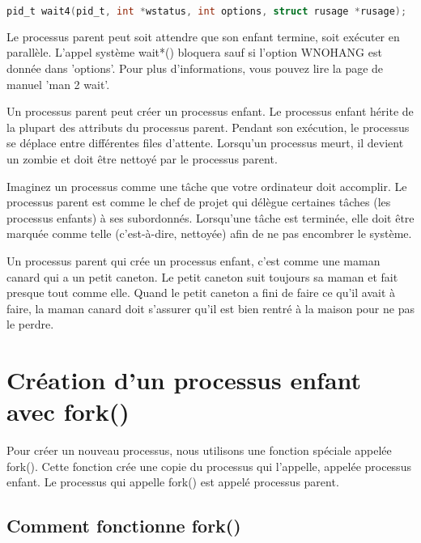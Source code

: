 \documentclass[12pt]{report}
\begin{document}
\begin{lstlisting}[language=C]
pid_t wait4(pid_t, int *wstatus, int options, struct rusage *rusage);
\end{lstlisting}

Le processus parent peut soit attendre que son enfant termine, soit exécuter en parallèle. L'appel système wait*() bloquera sauf si l'option WNOHANG est donnée dans 'options'. Pour plus d'informations, vous pouvez lire la page de manuel 'man 2 wait'.
\begin{tcolorbox}[colback=yellow!5, colframe=yellow!80!black, title={\faBookmark À retenir}]
Un processus parent peut créer un processus enfant. Le processus enfant hérite de la plupart des attributs du processus parent. Pendant son exécution, le processus se déplace entre différentes files d'attente. Lorsqu'un processus meurt, il devient un zombie et doit être nettoyé par le processus parent.
\end{tcolorbox}
\begin{tcolorbox}[colback=green!5, colframe=green!75!black, title={\faLightbulb Intuition}]
Imaginez un processus comme une tâche que votre ordinateur doit accomplir. Le processus parent est comme le chef de projet qui délègue certaines tâches (les processus enfants) à ses subordonnés. Lorsqu'une tâche est terminée, elle doit être marquée comme telle (c'est-à-dire, nettoyée) afin de ne pas encombrer le système.
\end{tcolorbox}
\begin{tcolorbox}[colback=blue!5, colframe=blue!75!black, title={\faLightbulb Vulgarisation simple}]
Un processus parent qui crée un processus enfant, c'est comme une maman canard qui a un petit caneton. Le petit caneton suit toujours sa maman et fait presque tout comme elle. Quand le petit caneton a fini de faire ce qu'il avait à faire, la maman canard doit s'assurer qu'il est bien rentré à la maison pour ne pas le perdre.
\end{tcolorbox}

\section{Création d'un processus enfant avec fork()} 

 Pour créer un nouveau processus, nous utilisons une fonction spéciale appelée fork(). Cette fonction crée une copie du processus qui l'appelle, appelée processus enfant. Le processus qui appelle fork() est appelé processus parent. 

 \subsection{Comment fonctionne fork()} 
\end{document}
